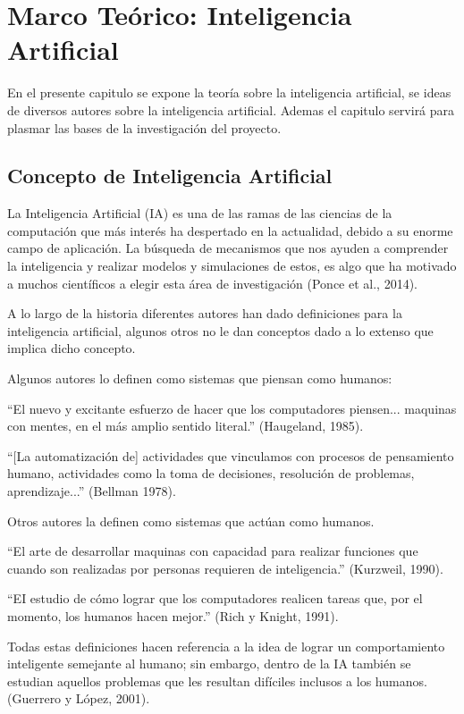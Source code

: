 

\chapter{Marco Teórico: Inteligencia Artificial}

En el presente capitulo se expone la teoría sobre la inteligencia artificial, se  ideas de diversos autores sobre la inteligencia artificial. Ademas el capitulo servirá para plasmar las bases de la investigación del proyecto.

\section{Concepto de Inteligencia Artificial} %

La Inteligencia Artificial (IA) es una de las ramas de las ciencias de la computación que más interés ha despertado en la actualidad, debido a su enorme campo de aplicación. La búsqueda de mecanismos que nos ayuden a comprender la inteligencia y realizar modelos y simulaciones de estos, es algo que ha motivado a muchos científicos a elegir esta área de investigación (Ponce et al., 2014).

A lo largo de la historia diferentes autores han dado definiciones para la inteligencia artificial, algunos otros no le dan conceptos dado a lo extenso que implica dicho concepto.

Algunos autores lo definen como sistemas que piensan como humanos: 

“El nuevo y excitante esfuerzo de hacer que los computadores piensen... maquinas con mentes, en el más amplio sentido 		literal.” (Haugeland, 1985).


“[La automatización de] actividades que vinculamos con procesos de pensamiento humano, actividades como la toma de decisiones, resolución de problemas, aprendizaje...” (Bellman 1978).

Otros autores la definen como sistemas que actúan como humanos.

“El arte de desarrollar maquinas con capacidad para realizar funciones que cuando son realizadas por personas requieren de inteligencia.” (Kurzweil, 1990).


“EI estudio de cómo lograr que los computadores realicen tareas que, por el momento, los humanos hacen mejor.” (Rich y Knight, 1991).


Todas estas definiciones hacen referencia a la idea de lograr un comportamiento inteligente semejante al humano; sin embargo, dentro de la IA también se estudian aquellos problemas que les resultan difíciles inclusos a los humanos. (Guerrero y López, 2001).



